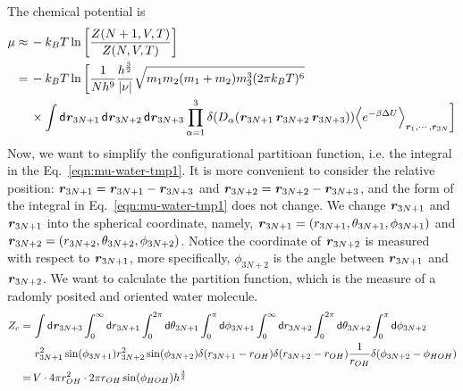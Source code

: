 \documentclass[aip,jcp,a4paper,reprint,onecolumn]{revtex4-1}
\newcommand{\vect}[1]{\textbf{\textit{#1}}}
\newcommand{\dd}[0]{\textsf{d}}
\begin{document}
The chemical potential is
\begin{align}\nonumber
  \mu 
  \approx\,&
  -k_BT \ln
  \bigg[
  \frac{Z(N+1,V,T)}{Z(N,V,T)}
  \bigg] \\ \nonumber
  =\,&
  -k_BT \ln
  \bigg[
  \frac{1}{N h^9}
  \frac{h^{\frac32}}{\vert \nu\vert}
  \sqrt{m_1 m_2 (m_1+m_2) m_3^3 (2\pi k_BT)^6}\\\label{eqn:mu-water-tmp1}
  &\times
  \int\dd\vect r_{3N+1}\,\dd\vect r_{3N+2}\,\dd\vect r_{3N+3}
  \prod_{\alpha=1}^3
  \delta(D_\alpha(\vect r_{3N+1}\,\vect r_{3N+2}\,\vect r_{3N+3}))
  \Big\langle e^{-\beta\Delta U} \Big\rangle_{\vect r_1, \cdots,\vect r_{3N}}
  \bigg]
\end{align}
Now, we want to simplify the configurational partitioan function, i.e.
the integral in the Eq.~\eqref{eqn:mu-water-tmp1}.
It is more convenient to consider the relative position:
$\vect r_{3N+1} = \vect r_{3N+1}  - \vect r_{3N+3}$ and
$\vect r_{3N+2} = \vect r_{3N+2}  - \vect r_{3N+3}$, and the form
of the integral in Eq.~\eqref{eqn:mu-water-tmp1} does not change.
We change $\vect r_{3N+1}$ and $\vect r_{3N+1}$ into the spherical coordinate, 
namely, $\vect r_{3N+1} = (r_{3N+1}, \theta_{3N+1}, \phi_{3N+1})$ and
$\vect r_{3N+2} = (r_{3N+2}, \theta_{3N+2}, \phi_{3N+2})$.
Notice the coordinate of $\vect r_{3N+2}$ is measured with respect to
$\vect r_{3N+1}$, more specifically, $\phi_{3N+2}$ is the angle between
$\vect r_{3N+1}$ and $\vect r_{3N+2}$.
We want to calculate the partition function, which is the measure of
a radomly posited and oriented water molecule.
\begin{align}\nonumber
  Z_c =\,&
  \int \dd \vect r_{3N+3}
  \int_0^\infty\dd r_{3N+1} \int_0^{2\pi}\dd \theta_{3N+1} \int_0^\pi\dd\phi_{3N+1}
  \int_0^\infty\dd r_{3N+2} \int_0^{2\pi}\dd \theta_{3N+2} \int_0^\pi\dd\phi_{3N+2}
  \\\nonumber
  &\,
  r_{3N+1}^2\sin(\phi_{3N+1})
  r_{3N+2}^2\sin(\phi_{3N+2})
  \delta(r_{3N+1} - r_{OH})
  \delta(r_{3N+2} - r_{OH})
  \frac{1}{r_{OH}}\delta(\phi_{3N+2} - \phi_{HOH})
  \\\nonumber
  =\,&
  V\cdot 4\pi r_{OH}^2 \cdot 2\pi r_{OH}\sin(\phi_{HOH}) h^{\frac32}
\end{align}
\end{document}
